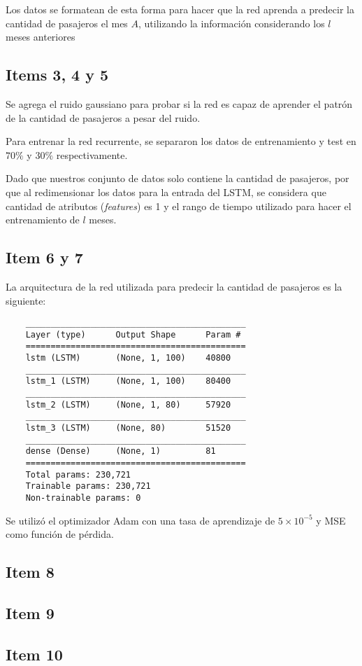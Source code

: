 Los datos se formatean de esta forma para hacer que la red aprenda a predecir la cantidad de pasajeros el mes $A$, utilizando la información considerando los $l$ meses anteriores

\subsection*{Items 3, 4 y 5}

Se agrega el ruido gaussiano para probar si la red es capaz de aprender el patrón de la cantidad de pasajeros a pesar del ruido. 

Para entrenar la red recurrente, se separaron los datos de entrenamiento y test en $70\%$ y $30\%$ respectivamente. 

Dado que nuestros conjunto de datos solo contiene la cantidad de pasajeros, por que al redimensionar los datos para la entrada del LSTM, se considera que cantidad de atributos  (\emph{features}) es 1 y el rango de tiempo utilizado para hacer el entrenamiento de $l$ meses.

\subsection*{Item 6 y 7}

La arquitectura de la red utilizada para predecir la cantidad de pasajeros es la siguiente:

\begin{verbatim}
	____________________________________________
	Layer (type)      Output Shape      Param # 
	============================================
	lstm (LSTM)       (None, 1, 100)    40800   
	____________________________________________
	lstm_1 (LSTM)     (None, 1, 100)    80400   
	____________________________________________
	lstm_2 (LSTM)     (None, 1, 80)     57920   
	____________________________________________
	lstm_3 (LSTM)     (None, 80)        51520   
	____________________________________________
	dense (Dense)     (None, 1)         81      
	============================================
	Total params: 230,721
	Trainable params: 230,721
	Non-trainable params: 0
\end{verbatim}

Se utilizó el optimizador Adam con una tasa de aprendizaje de $5\times10^{-5}$ y MSE como función de pérdida.


\subsection*{Item 8}

\subsection*{Item 9}

\subsection*{Item 10}


